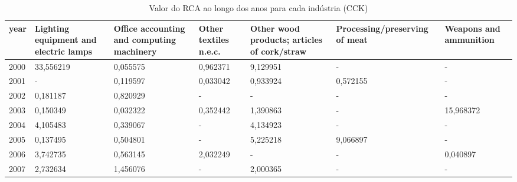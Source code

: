 \begin{table}
\centering
\caption{Valor do RCA ao longo dos anos para cada indústria (CCK)}
\begin{tabular}{p{1cm}p{2cm}p{2cm}p{2cm}p{2cm}p{2cm}p{2cm}}
\toprule
 year &  Lighting equipment and electric lamps &  Office accounting and computing machinery &  Other textiles n.e.c. &  Other wood products; articles of cork/straw &  Processing/preserving of meat &  Weapons and ammunition \\
\midrule
 2000 &                              33,556219 &                                   0,055575 &               0,962371 &                                     9,129951 &                              - &                       - \\
 2001 &                                      - &                                   0,119597 &               0,033042 &                                     0,933924 &                       0,572155 &                       - \\
 2002 &                               0,181187 &                                   0,820929 &                      - &                                            - &                              - &                       - \\
 2003 &                               0,150349 &                                   0,032322 &               0,352442 &                                     1,390863 &                              - &               15,968372 \\
 2004 &                               4,105483 &                                   0,339067 &                      - &                                     4,134923 &                              - &                       - \\
 2005 &                               0,137495 &                                   0,504801 &                      - &                                     5,225218 &                       9,066897 &                       - \\
 2006 &                               3,742735 &                                   0,563145 &               2,032249 &                                            - &                              - &                0,040897 \\
 2007 &                               2,732634 &                                   1,456076 &                      - &                                     2,000365 &                              - &                       - \\

\end{tabular}
\end{table}
